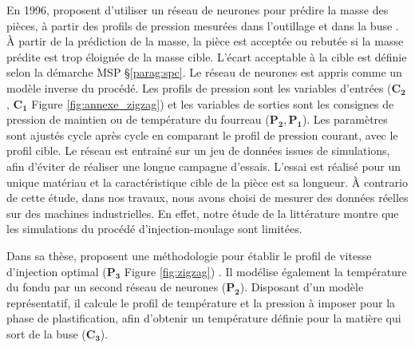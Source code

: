 En 1996, \citeauthor{woll_online_1996} proposent d'utiliser un réseau de neurones pour prédire la masse des pièces, à partir des profils de pression mesurées dans l'outillage et dans la buse \cite{woll_online_1996}.
À partir de la prédiction de la masse, la pièce est acceptée ou rebutée si la masse prédite est trop éloignée de la masse cible.
L'écart acceptable à la cible est définie selon la démarche MSP §\ref{parag:spc}.
Le réseau de neurones est appris comme un modèle inverse du procédé.
Les profils de pression sont les variables d'entrées ($\boldsymbol{C_2}$, $\boldsymbol{C_1}$ Figure \ref{fig:annexe_zigzag}) et les variables de sorties sont les consignes de pression de maintien ou de température du fourreau ($\boldsymbol{P_2, P_1}$).
Les paramètres sont ajustés cycle après cycle en comparant le profil de pression courant, avec le profil cible.
Le réseau est entrainé sur un jeu de données issues de simulations, afin d'éviter de réaliser une longue campagne d'essais.
L'essai est réalisé pour un unique matériau et la caractéristique cible de la pièce est sa longueur.
À contrario de cette étude, dans nos travaux, nous avons choisi de mesurer des données réelles sur des machines industrielles.
En effet, notre étude de la littérature montre que les simulations du procédé d'injection-moulage sont limitées.

Dans sa thèse, \citeauthor{chen_study_2002} proposent une méthodologie pour établir le profil de vitesse d’injection optimal ($\boldsymbol{P_3}$ Figure \ref{fig:zigzag}) \cite{chen_study_2002}.
Il modélise également la température du fondu par un second réseau de neurones ($\boldsymbol{P_2}$).
Disposant d'un modèle représentatif, il calcule le profil de température et la pression à imposer pour la phase de plastification, afin d'obtenir un température définie pour la matière qui sort de la buse ($\boldsymbol{C_3}$). 


